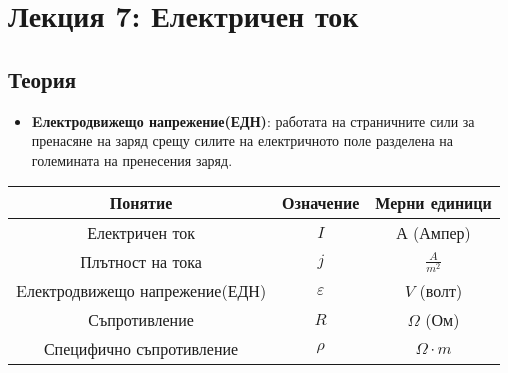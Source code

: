 \documentclass[fleqn, 12pt]{article}
\theoremstyle{definition}
\begin{document}
\newpage
\section{Лекция 7: Електричен ток}

\subsection{Теория}
\begin{itemize}
\item \textbf{Eлектродвижещо напрежение(ЕДН)}: работата на страничните сили за пренасяне на заряд срещу силите на електричното поле разделена на големината на пренесения заряд.
\end{itemize}

\begin{center}

\begin{tabular}{ |c|c|c|}
\hline
\textbf{Понятие} &\textbf{Означение} & \textbf{Мерни единици}\\
\hline
Електричен ток & $I$ & $А$ (Ампер)\\
\hline
Плътност на тока& $j$ & $\frac{A}{m^2}$\\
\hline
Eлектродвижещо напрежение(ЕДН) & $\varepsilon$ & $V$ (волт) \\
\hline
Съпротивление & $R$ & $\Omega$ (Ом) \\
\hline
Специфично съпротивление & $\rho$ & $\Omega \cdot m$ \\
\hline
\end{tabular}
\end{center}

\newpage
\end{document}
